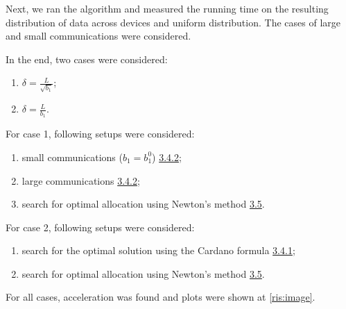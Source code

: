 \documentclass{article}
\theoremstyle{definition}
\theoremstyle{plain}
\begin{document}
Next, we ran the algorithm and measured the running time on the resulting distribution of data across devices and uniform distribution. The cases of large and small communications were considered. 

In the end, two cases were considered: 
\begin{enumerate}
    \item $\delta = \frac{L}{\sqrt{b_1}}$;
    \item $\delta = \frac{L}{b_1}$.
\end{enumerate}

For case 1, following setups were considered:
\begin{enumerate}
    \item small communications ($b_1 = b_1^0$) \hyperref[eq:3.4.2]{3.4.2};
    \item large communications \hyperref[eq:3.4.2]{3.4.2};
    \item search for optimal allocation using Newton's method \hyperref[eq:3.5]{3.5}.
\end{enumerate}

For case 2, following setups were considered:
\begin{enumerate}
    \item search for the optimal solution using the Cardano formula \hyperref[eq:3.4.1]{3.4.1};
    \item search for optimal allocation using Newton's method \hyperref[eq:3.5]{3.5}.
\end{enumerate}

For all cases, acceleration was found and plots were shown at \ref{ris:image}.
\end{document}
